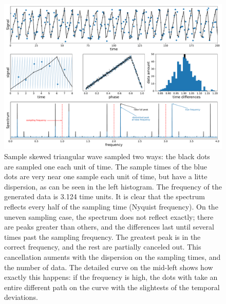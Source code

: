 \begin{figure}
	\centering
	\includegraphics[width=\textwidth]{img/uneven_advantage.pdf}
	\caption[Comparison between even and uneven sampled signal past the nyquist limit]{
		Sample skewed triangular wave sampled two ways: the black dots are sampled one each unit of time.
		The sample times of the blue dots are very near one sample each unit of time, but have a litte dispersion,
		as can be seen in the left histogram.
		The frequency of the generated data is 3.124 time units.
		It is clear that the spectrum reflects every half of the sampling time (Nyquist frequency). 
		On the uneven sampling case, the spectrum does not reflect exactly; there are peaks greater than others,
		and the differences last until several times past the sampling frequency.
		The greatest peak is in the correct frequency, and the rest are partially canceled out.
		This cancellation auments with the dispersion on the sampling times, and the number of data.
		The detailed curve on the mid-left shows how exactly this happens: if the frequency is high, the dots with take an entire different path on the curve with the slightests of the temporal deviations.
	}
	\label{fig:uneven-advantage}
\end{figure}
